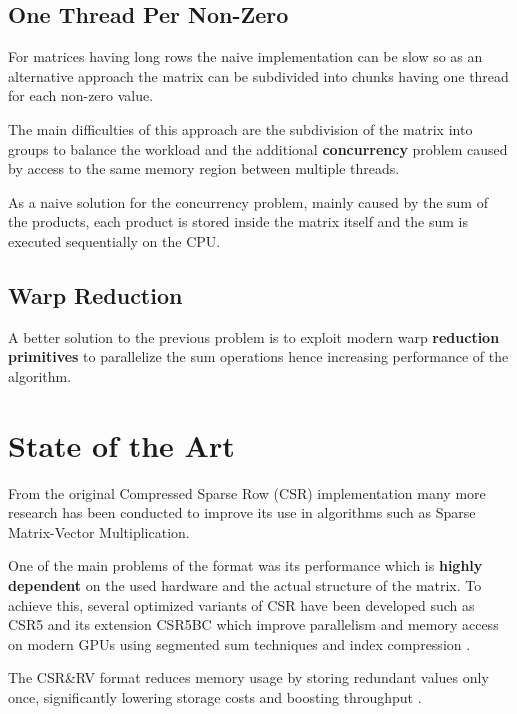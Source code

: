\documentclass[conference]{IEEEtran}
\begin{document}
    \subsection{One Thread Per Non-Zero}

    For matrices having long rows the naive implementation can be slow so as an
    alternative approach the matrix can be subdivided into chunks having one
    thread for each non-zero value.

    The main difficulties of this approach are the subdivision of the matrix
    into groups to balance the workload and the additional \textbf{concurrency}
    problem caused by access to the same memory region between multiple threads.

    As a naive solution for the concurrency problem, mainly caused by the sum
    of the products, each product is stored inside the matrix itself and the
    sum is executed sequentially on the CPU.

    \subsection{Warp Reduction}

    A better solution to the previous problem is to exploit modern warp
    \textbf{reduction primitives} to parallelize the sum operations hence
    increasing performance of the algorithm.

    \section{State of the Art}

    From the original Compressed Sparse Row (CSR) \cite{eisenstat1977csr}
    implementation many more research has been conducted to improve its use in
    algorithms such as Sparse Matrix-Vector Multiplication.

    One of the main problems of the format was its performance which is
    \textbf{highly dependent} on the used hardware and the actual structure of
    the matrix.
    To achieve this, several optimized variants of CSR have been developed such
    as CSR5 and its extension CSR5BC which improve parallelism and memory
    access on modern GPUs using segmented sum techniques and index compression
    \cite{zhang2016csr5}.

    The CSR\&RV format reduces memory usage by storing redundant values only
    once, significantly lowering storage costs and boosting throughput
    \cite{tang2023csrrv}.
\end{document}
